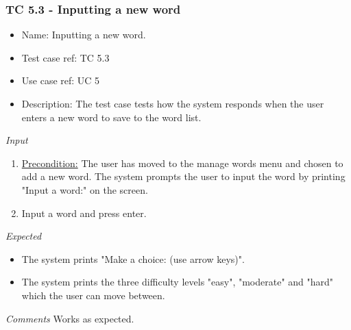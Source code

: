 \documentclass[12pt, letterpaper]{article}
\begin{document}
\subsubsection{TC 5.3 - Inputting a new word}
\begin{itemize}
	\item Name: Inputting a new word.
	\item Test case ref: TC 5.3
	\item Use case ref: UC 5
	\item Description: The test case tests how the system responds when the user enters a new word to save to the word list.
\end{itemize}
\emph{Input}
\begin{enumerate}
	\item \underline{Precondition:} The user has moved to the manage words menu and chosen to add a new word. The system prompts the user to input the word by printing "Input a word:" on the screen.
	\item Input a word and press enter.
\end{enumerate}
\emph{Expected}
\begin{itemize}
	\item The system prints "Make a choice: (use arrow keys)".
	\item The system prints the three difficulty levels "easy", "moderate" and "hard" which the user can move between.
\end{itemize}
\begin{Form}
\newline
{}
\newline
\end{Form}
\newline
\emph{Comments}
Works as expected.
\end{document}
